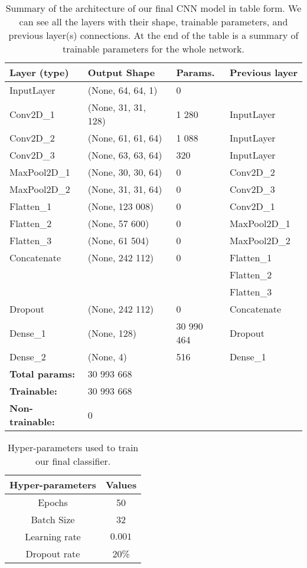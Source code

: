 \documentclass[fleqn,usenatbib]{mnras}
\begin{document}
\begin{table}
\centering
\caption{Summary of the architecture of our final CNN model in table form. We can see all the layers with their shape, trainable parameters, and previous layer(s) connections. At the end of the table is a summary of trainable parameters for the whole network.}
\begin{tabular}{llll}
\hline                                    
\textbf{Layer (type)  }                                & \textbf{Output Shape }  & \textbf{\textbf{Params.}}  & \textbf{Previous layer}                                              \\ \hline
InputLayer & (None, 64, 64, 1) & 0  &         \\
Conv2D\_1 & (None, 31, 31, 128) & 1 280 & InputLayer   \\
Conv2D\_2 & (None, 61, 61, 64) & 1 088  & InputLayer       \\
Conv2D\_3  & (None, 63, 63, 64) & 320 & InputLayer   \\
MaxPool2D\_1 & (None, 30, 30, 64)   & 0 & Conv2D\_2          \\
MaxPool2D\_2  & (None, 31, 31, 64)     & 0 & Conv2D\_3   \\ 
Flatten\_1 & (None, 123 008)     & 0 & Conv2D\_1   \\
Flatten\_2 & (None, 57 600)     & 0  & MaxPool2D\_1 \\
Flatten\_3 & (None, 61 504)     & 0  & MaxPool2D\_2 \\
Concatenate & (None, 242 112)     & 0 &  Flatten\_1 \\
 &     &  &  Flatten\_2 \\
 &     &  &  Flatten\_3 \\
Dropout  & (None, 242 112)     & 0 & Concatenate   \\
Dense\_1 & (None, 128)     & 30 990 464 & Dropout    \\
Dense\_2  & (None, 4)     & 516  & Dense\_1   \\
\hline
\textbf{Total params:}                   &   30 993 668              &          \\
\textbf{Trainable:}                    &    30 993 668           &          \\
\textbf{Non-trainable:}                     &     0          &         \\ \hline
\end{tabular}
\label{tab:sum}
\end{table}

\begin{table}
	\centering
	\caption{Hyper-parameters used to train our final classifier.}
	\label{tab:hyperparam}
	\begin{tabular}{cc} %
		\hline
		 \textbf{Hyper-parameters} & \textbf{Values}\\
		\hline
	     Epochs & 50\\
         Batch Size & 32\\
		 Learning rate & $0.001$\\
		 Dropout rate &  20\% \\
		\hline
	\end{tabular}
\end{table}
\end{document}
